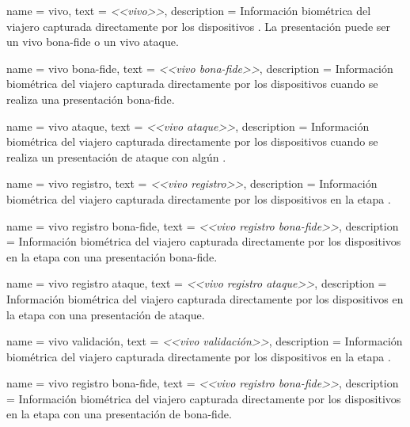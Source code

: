 {
    name        = {vivo},
    text        = {\textit{<<vivo>>}},
    description = {Información biométrica del viajero capturada directamente por los dispositivos . La presentación puede ser un \gls{vivo bona-fide} o un \gls{vivo ataque}.}
}

{
    name        = {vivo bona-fide},
    text        = {\textit{<<vivo \mbox{bona-fide}>>}},
    description = {Información biométrica del viajero capturada directamente por los dispositivos  cuando se realiza una presentación \gls{bona-fide}.}
}

{
    name        = {vivo ataque},
    text        = {\textit{<<vivo ataque>>}},
    description = {Información biométrica del viajero capturada directamente por los dispositivos  cuando se realiza un presentación de ataque con algún .}
}

{
    name        = {vivo registro},
    text        = {\textit{<<vivo registro>>}},
    description = {Información biométrica del viajero capturada directamente por los dispositivos  en la etapa .}
}

{
    name        = {vivo registro bona-fide},
    text        = {\textit{<<vivo registro \mbox{bona-fide}>>}},
    description = {Información biométrica del viajero capturada directamente por los dispositivos  en la etapa  con una presentación \gls{bona-fide}.}
}

{
    name        = {vivo registro ataque},
    text        = {\textit{<<vivo registro ataque>>}},
    description = {Información biométrica del viajero capturada directamente por los dispositivos  en la etapa  con una presentación de ataque.}
}

{
    name        = {vivo validación},
    text        = {\textit{<<vivo validación>>}},
    description = {Información biométrica del viajero capturada directamente por los dispositivos  en la etapa .}
}

{
    name        = {vivo registro bona-fide},
    text        = {\textit{<<vivo registro \mbox{bona-fide}>>}},
    description = {Información biométrica del viajero capturada directamente por los dispositivos  en la etapa  con una presentación de \gls{bona-fide}.}
}

